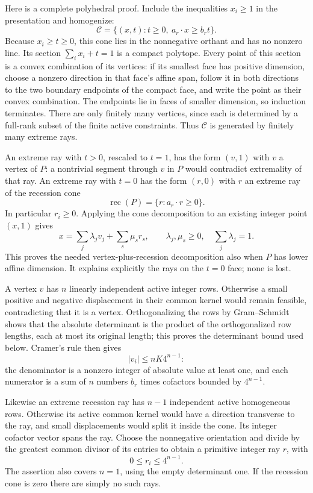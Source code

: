 Here is a complete polyhedral proof. Include the inequalities
$x_i\ge1$ in the presentation and homogenize:
\[
 \mathcal C=\{(x,t):t\ge0,\ a_r\cdot x\ge b_rt\}.
\]
Because $x_i\ge t\ge0$, this cone lies in the nonnegative
orthant and has no nonzero line. Its section
$\sum_i x_i+t=1$ is a compact polytope. Every point of
this section is a convex combination of its vertices:
if its smallest face has positive dimension, choose a
nonzero direction in that face's affine span, follow it
in both directions to the two boundary endpoints of
the compact face, and write the point as their convex
combination. The endpoints lie in faces of smaller
dimension, so induction terminates. There are only
finitely many vertices, since each is determined by
a full-rank subset of the finite active constraints.
Thus $\mathcal C$ is generated by finitely many extreme
rays.

An extreme ray with $t>0$, rescaled to $t=1$, has the
form $(v,1)$ with $v$ a vertex of $P$: a nontrivial
segment through $v$ in $P$ would contradict extremality
of that ray. An extreme ray with $t=0$ has the form
$(r,0)$ with $r$ an extreme ray of the recession cone
\[
 \operatorname{rec}(P)=\{r:a_r\cdot r\ge0\}.
\]
In particular $r_i\ge0$. Applying the cone decomposition
to an existing integer point $(x,1)$ gives
\[
 x=\sum_j\lambda_jv_j+\sum_s\mu_s r_s,
 \qquad \lambda_j,\mu_s\ge0,\quad\sum_j\lambda_j=1.
 \tag{G029.4}
\]
This proves the needed vertex-plus-recession decomposition
also when $P$ has lower affine dimension. It explains
explicitly the rays on the $t=0$ face; none is lost.

A vertex $v$ has $n$ linearly independent active integer
rows. Otherwise a small positive and negative displacement
in their common kernel would remain feasible, contradicting
that it is a vertex. Orthogonalizing the rows by Gram--Schmidt shows that the
absolute determinant is the product of the orthogonalized
row lengths, each at most its original length; this proves
the determinant bound used below. Cramer's rule then gives
\[
 |v_i|\le nK4^{n-1}:                                  \tag{G029.5}
\]
the denominator is a nonzero integer of absolute value at
least one, and each numerator is a sum of $n$ numbers
$b_r$ times cofactors bounded by $4^{n-1}$.

Likewise an extreme recession ray has $n-1$ independent
active homogeneous rows. Otherwise its active common
kernel would have a direction transverse to the ray,
and small displacements would split it inside the cone.
Its integer cofactor vector spans the ray. Choose the
nonnegative orientation and divide by the greatest common
divisor of its entries to obtain a primitive integer
ray $r$, with
\[
 0\le r_i\le4^{n-1}.                                 \tag{G029.6}
\]
The assertion also covers $n=1$, using the empty determinant
one. If the recession cone is zero there are simply no
such rays.

